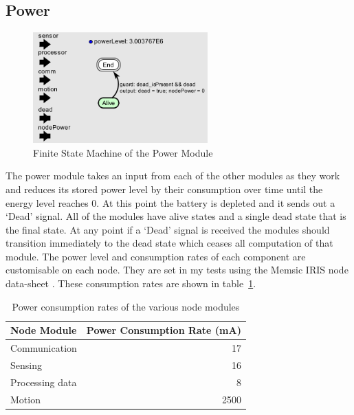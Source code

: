 \documentclass[authoryearcitations]{UoYCSproject}
\begin{document}
\subsection{Power}

\begin{figure}
 \centering
    \includegraphics[width=0.6\textwidth]{figures/power_Controller.png}
    \caption{Finite State Machine of the Power Module}
    \label{fig:powerControl}
\end{figure}

The power module takes an input from each of the other modules as they work and reduces its stored power level by their consumption over time until the energy level reaches 0. At this point the battery is depleted and it sends out a `Dead' signal. All of the modules have alive states and a single dead state that is the final state. At any point if a `Dead' signal is received the modules should transition immediately to the dead state which ceases all computation of that module. The power level and consumption rates of each component are customisable on each node. They are set in my tests using the Memsic IRIS node data-sheet \citep{Memsic2011}. These consumption rates are shown in table~\ref{tab:powerRates}.

\begin{table}[]
\centering
\begin{tabular}{@{}lr@{}}
\toprule
Node Module     & Power Consumption Rate (mA) \\ \midrule
Communication   & 17                          \\
Sensing         & 16                          \\
Processing data & 8                           \\
Motion          & 2500                        \\ \bottomrule
\end{tabular}
\caption{Power consumption rates of the various node modules}
\label{tab:powerRates}
\end{table}
\end{document}

